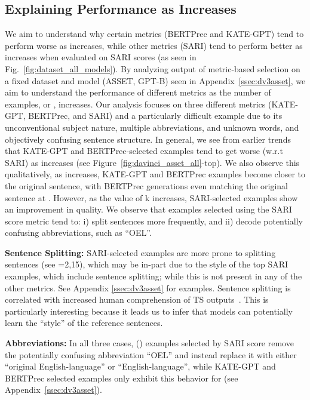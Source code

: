 \documentclass[11pt]{article}
\begin{document}
\subsection{Explaining Performance as  Increases}
We aim to understand why certain metrics (BERTPrec and KATE-GPT) tend to perform worse as  increases, while other metrics (SARI) tend to perform better as  increases when evaluated on SARI scores (as seen in Fig.~\ref{fig:dataset_all_models}).  By analyzing output of metric-based selection on a fixed dataset and model (ASSET, GPT-B) seen in Appendix~\ref{ssec:dv3asset}, we aim to understand the performance of different metrics as the number of examples, or , increases. Our analysis focuses on three different metrics (KATE-GPT, BERTPrec, and SARI) and a particularly difficult example due to its unconventional subject nature, multiple abbreviations, and unknown words, and objectively confusing sentence structure. In general, we see from earlier trends that KATE-GPT and BERTPrec-selected examples tend to get worse (w.r.t SARI) as  increases (see Figure~\ref{fig:davinci_asset_all}-top). We also observe this qualitatively, as  increases, KATE-GPT and BERTPrec examples become closer to the original sentence, with BERTPrec generations even matching the original sentence at . However, as the value of k increases, SARI-selected examples show an improvement in quality. We observe that examples selected using the SARI score metric tend to: i) split sentences more frequently, and ii) decode potentially confusing abbreviations, such as ``OEL''.

\textbf{Sentence Splitting: } SARI-selected examples are more prone to splitting sentences (see =2,15), which may be in-part due to the style of the top SARI examples, which include sentence splitting; while this is not present in any of the other metrics. See Appendix \ref{ssec:dv3asset} for examples. Sentence splitting is correlated with increased human comprehension of TS outputs~\cite{williams-etal-2003-experiments}. This is particularly interesting because it leads us to infer that models can potentially learn the ``style'' of the reference sentences. 

\textbf{Abbreviations:} In all three cases, () examples selected by SARI score remove the potentially confusing abbreviation ``OEL'' and instead replace it with either ``original English-language'' or ``English-language'', while KATE-GPT and BERTPrec selected examples only exhibit this behavior for  (see Appendix~\ref{ssec:dv3asset}).
\end{document}
